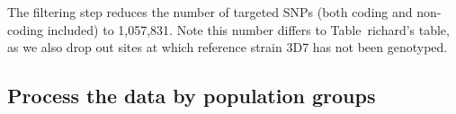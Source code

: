\documentclass{article}
\begin{document}
The filtering step reduces the number of targeted SNPs (both coding and non-coding included) to 1,057,831. Note this number differs to Table~{richard's table}, as we also
drop out sites at which reference strain 3D7 has not been genotyped.



\subsection{Process the data by population groups}
\end{document}
